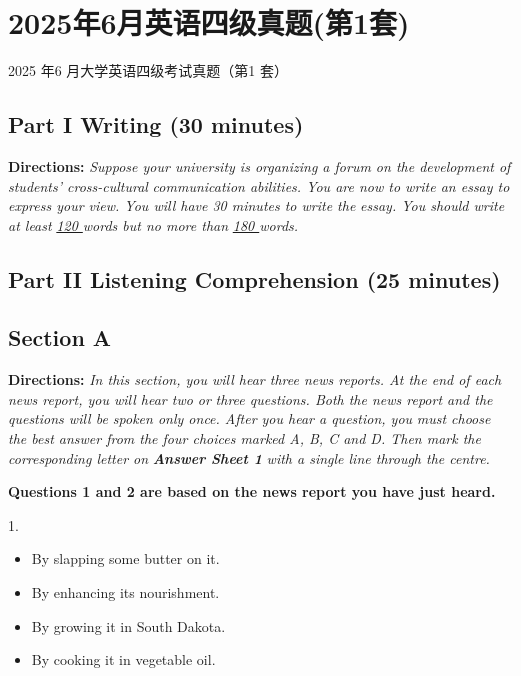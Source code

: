 \documentclass[UTF8,11pt]{ctexart}
\begin{document}
\section*{2025年6月英语四级真题(第1套)}
2025 年6 月大学英语四级考试真题（第1 套）


\subsection*{\textbf{Part I Writing} \textbf{(30 minutes)}}


\textbf{Directions:} \textit{Suppose your university is organizing a forum on the development of students’ cross-cultural} \textit{communication abilities. You are now to write an essay to express your view. You will have 30 minutes to write the} \textit{essay. You should write at least }\textit{\uline{120 }}\textit{words but no more than }\textit{\uline{180 }}\textit{words.}


\subsection*{\textbf{Part II} \textbf{Listening Comprehension} \textbf{(25 minutes)}}


\subsection*{\textbf{Section A}}


\textbf{Directions:} \textit{In this section, you will hear three news reports. At the end of each news report, you will hear two or} \textit{three questions. Both the news report and the questions will be spoken only once. After you hear a question, you} \textit{must choose the best answer from the four choices marked A, B, C and D. Then mark the corresponding letter on} \textbf{\textit{Answer Sheet 1}}\textit{ with a single line through the centre.}


\textbf{Questions 1 and 2 are based on the news report you have just heard.}


1.


\begin{itemize}[leftmargin=2em,itemsep=.2em,topsep=.4em]\item[A.] By slapping some butter on it.
\item[B.] By enhancing its nourishment.
\item[C.] By growing it in South Dakota.
\item[D.] By cooking it in vegetable oil.
\end{itemize}
\end{document}

